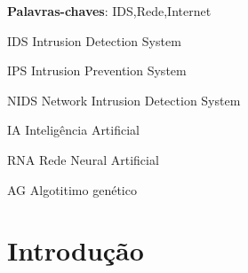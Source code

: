 \documentclass[
	12pt,				%
	openright,			%
	oneside,
	a4paper,			%
	english,			%
	french,				%
	spanish,			%
	brazil				%
	]{abntex2}
\begin{document}
\frenchspacing 


\imprimircapa

\imprimirfolhaderosto%


\setlength{\absparsep}{18pt} %
\begin{resumo}
   
 \textbf{Palavras-chaves}: IDS,Rede,Internet
\end{resumo}

\listoffigures*
\cleardoublepage

\listoftables*
\cleardoublepage

\begin{siglas}
  \item[IDS] Intrusion Detection System
  \item[IPS] Intrusion Prevention System
  \item[NIDS] Network Intrusion Detection System
  \item[IA] Inteligência Artificial
  \item[RNA] Rede Neural Artificial
  \item[AG] Algotitimo genético
\end{siglas}

\tableofcontents*
\cleardoublepage

\textual

\chapter[Introdução]{Introdução}
\end{document}
